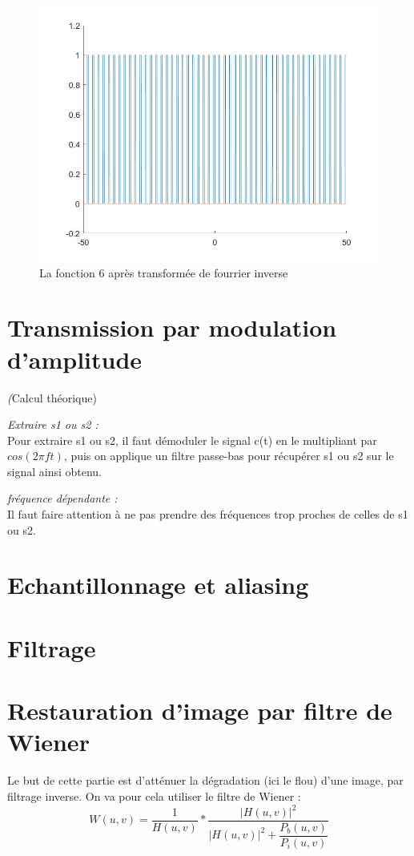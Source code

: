 \documentclass[10pt,a4paper]{article}
\begin{document}
\begin{figure}[!h]
\includegraphics[scale=0.35]{fct6.jpg}
\caption{La fonction 6 après transformée de fourrier inverse}
\end{figure}



\section{Transmission par modulation d'amplitude}
\textit(Calcul théorique)

\textit{Extraire s1 ou s2 : }\\
Pour extraire s1 ou s2, il faut démoduler le signal c(t) en le multipliant par $cos(2 \pi f t)$, puis on applique un filtre passe-bas pour récupérer s1 ou s2 sur le signal ainsi obtenu.

\textit{fréquence dépendante : }\\
Il faut faire attention à ne pas prendre des fréquences trop proches de celles de s1 ou s2.



\section{Echantillonnage et aliasing	}


\section{Filtrage}

\section{Restauration d'image par filtre de Wiener}
Le but de cette partie est d'atténuer la dégradation (ici le flou) d'une image, par filtrage inverse. On va pour cela utiliser le filtre de Wiener : 
\[
	W(u,v) = \frac{1}{H(u,v)} * \frac{|H(u,v)|^2}{|H(u,v)|^2+\dfrac{P_b(u,v)}{P_i (u,v)}}	
\]
\end{document}
